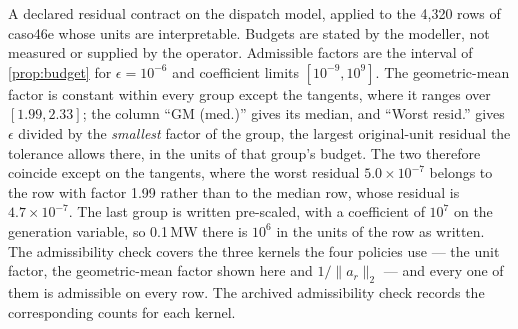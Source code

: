 \documentclass[smallextended,envcountsect,envcountsame]{svjour3}
\begin{document}
\begin{table}[tb]
\centering\small
\caption{A declared residual contract on the dispatch model, applied to the 4,320 rows of
caso46e whose units are interpretable. Budgets are stated by the modeller, not measured or
supplied by the operator. Admissible factors are the interval of \cref{prop:budget} for
$\epsilon=10^{-6}$ and coefficient limits $[10^{-9},10^{9}]$. The geometric-mean factor is
constant within every group except the tangents, where it ranges over $[1.99,2.33]$; the
column ``GM (med.)'' gives its median, and ``Worst resid.'' gives $\epsilon$ divided by the
\emph{smallest} factor of the group, the largest original-unit residual the tolerance allows
there, in the units of that group's budget. The two therefore coincide except on the tangents, where the worst residual
$5.0\times10^{-7}$ belongs to the row with factor 1.99 rather than to the median row, whose
residual is $4.7\times10^{-7}$. The last group is written pre-scaled, with a coefficient of $10^7$ on the generation
variable, so 0.1\,MW there is $10^{6}$ in the units of the row as written. The admissibility
check covers the three kernels the four policies use --- the unit factor, the geometric-mean
factor shown here and $1/\|a_r\|_2$ --- and every one of them is admissible on every row. The
archived admissibility check records the corresponding counts for each kernel.}
\label{tab:application-budget}
\resizebox{\textwidth}{!}{}
\end{table}
\end{document}
